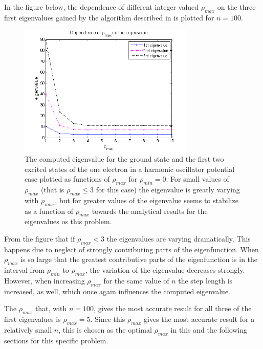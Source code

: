 In the figure below, the dependence of different integer valued $\rho_{max}$ on the three first eigenvalues gained by the algorithm described in  is plotted for $n=100$. 
\begin{figure}[H]
	\centering
	\includegraphics[width=0.75\textwidth]{Figures/rho_maxOnEigenvalue.png}
	\caption{The computed eigenvalue for the ground state and the first two excited states of the one electron in a harmonic oscillator potential case plotted as functions of $\rho_{max}$ for $\rho_{min} = 0$. For small values of $\rho_{max}$ (that is $\rho_{max} \leq 3$ for this case) the eigenvalue is greatly varying with $\rho_{max}$, but for greater values of the eigenvalue seems to stabilize as a function of $\rho_{max}$ towards the analytical results for the eigenvalues os this problem.}
	\label{fig:DependenceOnEigenvalue1}
\end{figure}
From the figure that if $\rho_{max} < 3$ the eigenvalues are varying dramatically.
This happens due to neglect of strongly contributing parts of the eigenfunction. 
When $\rho_{max}$ is so large that the greatest contributive parts of the eigenfunction is in the interval from $\rho_{min}$ to $\rho_{max}$, the variation of the eigenvalue decreases strongly.
However, when increasing $\rho_{max}$ for the same value of $n$ the step length is increased, as well, which once again influences the computed eigenvalue.
 
The $\rho_{max}$ that, with $n=100$, gives the most accurate result for all three of the first eigenvalues is $\rho_{max} = 5$. 
Since this $\rho_{max}$ gives the most accurate result for a relatively small $n$, this is chosen as the optimal $\rho_{max}$ in this and the following sections for this specific problem. 


